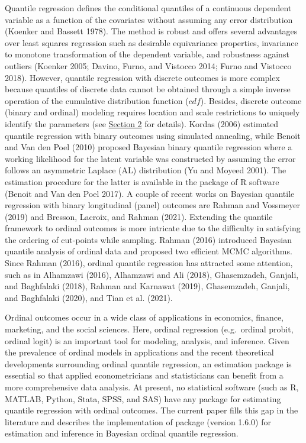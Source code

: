 Quantile regression defines the conditional quantiles of a continuous dependent variable as a function of the covariates without assuming any error distribution (Koenker and Bassett 1978). The method is robust and offers several advantages over least squares regression such as desirable equivariance properties, invariance to monotone transformation of the dependent variable, and robustness against outliers (Koenker 2005; Davino, Furno, and Vistocco 2014; Furno and Vistocco 2018). However, quantile regression with discrete outcomes is more complex because quantiles of discrete data cannot be obtained through a simple inverse operation of the cumulative distribution function (\({cdf}\)). Besides, discrete outcome (binary and ordinal) modeling requires location and scale restrictions to uniquely identify the parameters (see \protect\hyperlink{sec:QROrdinal}{Section 2} for details). Kordas (2006) estimated quantile regression with binary outcomes using simulated annealing, while Benoit and Van den Poel (2010) proposed Bayesian binary quantile regression where a working likelihood for the latent variable was constructed by assuming the error follows an asymmetric Laplace (AL) distribution (Yu and Moyeed 2001). The estimation procedure for the latter is available in the  package of R software (Benoit and Van den Poel 2017). A couple of recent works on Bayesian quantile regression with binary longitudinal (panel) outcomes are Rahman and Vossmeyer (2019) and Bresson, Lacroix, and Rahman (2021). Extending the quantile framework to ordinal outcomes is more intricate due to the difficulty in satisfying the ordering of cut-points while sampling. Rahman (2016) introduced Bayesian quantile analysis of ordinal data and proposed two efficient MCMC algorithms. Since Rahman (2016), ordinal quantile regression has attracted some attention, such as in Alhamzawi (2016), Alhamzawi and Ali (2018), Ghasemzadeh, Ganjali, and Baghfalaki (2018), Rahman and Karnawat (2019), Ghasemzadeh, Ganjali, and Baghfalaki (2020), and Tian et al. (2021).

Ordinal outcomes occur in a wide class of applications in economics, finance, marketing, and the social sciences. Here, ordinal regression (e.g.~ordinal probit, ordinal logit) is an important tool for modeling, analysis, and inference. Given the prevalence of ordinal models in applications and the recent theoretical developments surrounding ordinal quantile regression, an estimation package is essential so that applied econometricians and statisticians can benefit from a more comprehensive data analysis. At present, no statistical software (such as R, MATLAB, Python, Stata, SPSS, and SAS) have any package for estimating quantile regression with ordinal outcomes. The current paper fills this gap in the literature and describes the implementation of  package (version 1.6.0) for estimation and inference in Bayesian ordinal quantile regression.

